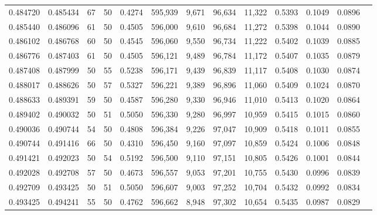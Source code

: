 \begin{tabular}{rrrrrrrrrrrrr}
0.484720 & 0.485434 &    67 &  50 &                                     0.4274 & 595,939 &   9,671 &  96,634 &  11,322 & 0.5393 & 0.1049 & 0.0896 \\
0.485440 & 0.486096 &    61 &  50 &                                     0.4505 & 596,000 &   9,610 &  96,684 &  11,272 & 0.5398 & 0.1044 & 0.0890 \\
0.486102 & 0.486768 &    60 &  50 &                                     0.4545 & 596,060 &   9,550 &  96,734 &  11,222 & 0.5402 & 0.1039 & 0.0885 \\
0.486776 & 0.487403 &    61 &  50 &                                     0.4505 & 596,121 &   9,489 &  96,784 &  11,172 & 0.5407 & 0.1035 & 0.0879 \\
0.487408 & 0.487999 &    50 &  55 &                                     0.5238 & 596,171 &   9,439 &  96,839 &  11,117 & 0.5408 & 0.1030 & 0.0874 \\
0.488017 & 0.488626 &    50 &  57 &                                     0.5327 & 596,221 &   9,389 &  96,896 &  11,060 & 0.5409 & 0.1024 & 0.0870 \\
0.488633 & 0.489391 &    59 &  50 &                                     0.4587 & 596,280 &   9,330 &  96,946 &  11,010 & 0.5413 & 0.1020 & 0.0864 \\
0.489402 & 0.490032 &    50 &  51 &                                     0.5050 & 596,330 &   9,280 &  96,997 &  10,959 & 0.5415 & 0.1015 & 0.0860 \\
0.490036 & 0.490744 &    54 &  50 &                                     0.4808 & 596,384 &   9,226 &  97,047 &  10,909 & 0.5418 & 0.1011 & 0.0855 \\
0.490744 & 0.491416 &    66 &  50 &                                     0.4310 & 596,450 &   9,160 &  97,097 &  10,859 & 0.5424 & 0.1006 & 0.0848 \\
0.491421 & 0.492023 &    50 &  54 &                                     0.5192 & 596,500 &   9,110 &  97,151 &  10,805 & 0.5426 & 0.1001 & 0.0844 \\
0.492028 & 0.492708 &    57 &  50 &                                     0.4673 & 596,557 &   9,053 &  97,201 &  10,755 & 0.5430 & 0.0996 & 0.0839 \\
0.492709 & 0.493425 &    50 &  51 &                                     0.5050 & 596,607 &   9,003 &  97,252 &  10,704 & 0.5432 & 0.0992 & 0.0834 \\
0.493425 & 0.494241 &    55 &  50 &                                     0.4762 & 596,662 &   8,948 &  97,302 &  10,654 & 0.5435 & 0.0987 & 0.0829 \\

\end{tabular}
